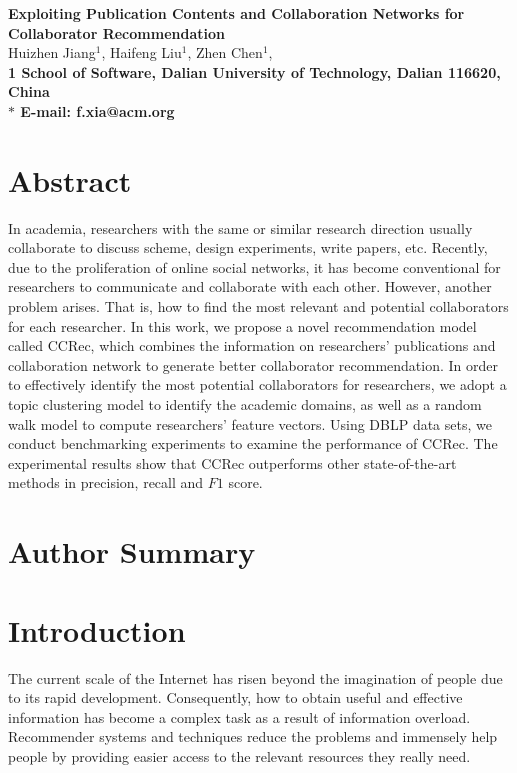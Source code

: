 \documentclass[10pt]{article}
\date{}
\begin{document}
\linenumbers

\begin{flushleft}
{\Large
\textbf{Exploiting Publication Contents and Collaboration Networks for Collaborator Recommendation}
}
\\
Huizhen Jiang$^{1}$,
Haifeng Liu$^{1}$,
Zhen Chen$^{1}$,
\\
\bf{1} School of Software, Dalian University of Technology, Dalian 116620, China
\\
$\ast$ E-mail: f.xia@acm.org
\end{flushleft}

\section*{Abstract}
In academia, researchers with the same or similar research direction usually collaborate to discuss scheme, design experiments, write papers, etc. Recently, due to the proliferation of online social networks, it has become conventional for researchers to communicate and collaborate with each other. However, another problem arises. That is, how to find the most relevant and potential collaborators for each researcher. In this work, we propose a novel recommendation model called CCRec, which combines the information on researchers' publications and collaboration network to generate better collaborator recommendation. In order to effectively identify the most potential collaborators for researchers, we adopt a topic clustering model to identify the academic domains, as well as a random walk model to compute researchers' feature vectors. Using DBLP data sets, we conduct benchmarking experiments to examine the performance of CCRec. The experimental results show that CCRec outperforms other state-of-the-art methods in precision, recall and $F1$ score.

\section*{Author Summary}


\section*{Introduction}
The current scale of the Internet has risen beyond the imagination of people due to its rapid development. Consequently, how to obtain useful and effective information has become a complex task as a result of information overload. Recommender systems and techniques reduce the problems and immensely help people by providing easier access to the relevant resources they really need.
\end{document}
